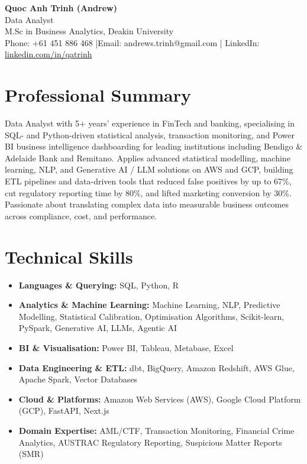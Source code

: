 \documentclass[11pt,a4paper]{article}
\begin{document}
{\fontsize{22}{26}\selectfont\textbf{Quoc Anh Trinh (Andrew)}}\\[3pt]
{\large Data Analyst}\\[4pt]
M.Sc in Business Analytics, Deakin University\\[3pt]
Phone: +61 451 886 468 \quad|\quad Email: andrews.trinh@gmail.com \quad|\quad
LinkedIn: \href{https://www.linkedin.com/in/qatrinh/}{linkedin.com/in/qatrinh}

\section*{Professional Summary}
Data Analyst with 5+ years' experience in FinTech and banking, specialising in SQL- and
Python-driven statistical analysis, transaction monitoring, and Power BI business
intelligence dashboarding for leading institutions including Bendigo \& Adelaide Bank and
Remitano. Applies advanced statistical modelling, machine learning, NLP, and Generative
AI / LLM solutions on
AWS and GCP, building ETL pipelines and data-driven tools that reduced false positives by
up to 67\%, cut regulatory reporting time by 80\%, and lifted marketing conversion by
30\%. Passionate about translating complex data into measurable business outcomes across
compliance, cost, and performance.

\section*{Technical Skills}
\begin{itemize}
  \item \textbf{Languages \& Querying:} SQL, Python, R
  \item \textbf{Analytics \& Machine Learning:} Machine Learning, NLP, Predictive Modelling, Statistical Calibration, Optimisation Algorithms, Scikit-learn, PySpark, Generative AI, LLMs, Agentic AI
  \item \textbf{BI \& Visualisation:} Power BI, Tableau, Metabase, Excel
  \item \textbf{Data Engineering \& ETL:} dbt, BigQuery, Amazon Redshift, AWS Glue, Apache Spark, Vector Databases
  \item \textbf{Cloud \& Platforms:} Amazon Web Services (AWS), Google Cloud Platform (GCP), FastAPI, Next.js
  \item \textbf{Domain Expertise:} AML/CTF, Transaction Monitoring, Financial Crime Analytics, AUSTRAC Regulatory Reporting, Suspicious Matter Reports (SMR)
\end{itemize}
\end{document}
